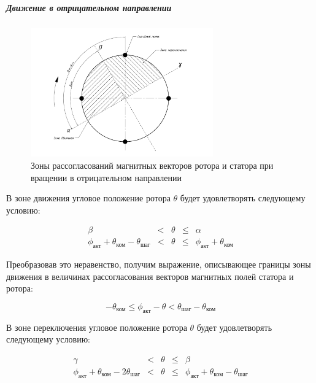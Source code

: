 \subparagraph{Движение в отрицательном направлении}
\begin{figure}
    \centering
    \includegraphics[width=0.7\textwidth, keepaspectratio]
                    {./src/pictures/feedback_control/pole_switch_zones_with_negative_dir}
    \caption{Зоны рассогласований магнитных векторов ротора и статора при вращении в отрицательном направлении}
    \label{pole_switch_zones_with_negative_dir}
\end{figure}

В зоне движения угловое положение ротора $\theta$ будет удовлетворять следующему условию:

\begin{equation}
    \label{movement_zone_negat_dir_for_curr_pos}
    \begin{array}{ccccc}
        \beta & < & \theta & \leq & \alpha                                         \\
        \phi_\textit{акт} + \theta_\textit{ком} - \theta_\textit{шаг}
        & <     & \theta
        & \leq  &\phi_\textit{акт} + \theta_\textit{ком}
    \end{array}
\end{equation}

Преобразовав это неравенство, получим выражение, описывающее границы зоны движения
в величинах рассогласования векторов магнитных полей статора и ротора:

\begin{equation}
    \label{movement_zone_negat_dir_for_delta}
    -\theta_\textit{ком}
    \leq \phi_\textit{акт} - \theta
    < \theta_\textit{шаг} - \theta_\textit{ком}
\end{equation}

В зоне переключения угловое положение ротора $\theta$ будет удовлетворять следующему условию:

\begin{equation}
    \label{switch_zone_negat_dir_for_curr_pos}
    \begin{array}{ccccc}
        \gamma & < & \theta & \leq & \beta                                         \\
        \phi_\textit{акт} + \theta_\textit{ком} - 2\theta_\textit{шаг}
        & <     & \theta
        & \leq  & \phi_\textit{акт} + \theta_\textit{ком} - \theta_\textit{шаг}
    \end{array}
\end{equation}

